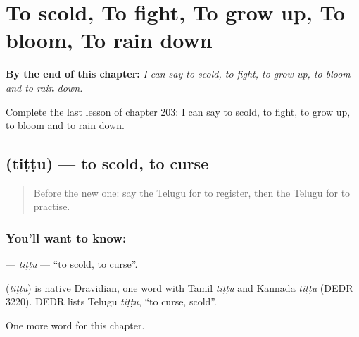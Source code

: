 
\chapter{To scold, To fight, To grow up, To bloom, To rain down}
\label{ch:te-to-scold-to-fight-to-grow-up-to-bloom-to-rain-down}

\begin{chapteropening}
\textbf{By the end of this chapter:} \emph{I can say to scold, to fight, to grow up, to bloom and to rain down.}

Complete the last lesson of chapter 203: I can say to scold, to fight, to grow up, to bloom and to rain down.
\end{chapteropening}

\section[\texorpdfstring{\te{తిట్టు} (tiṭṭu)}{తిట్టు (tiṭṭu)}]{ (tiṭṭu) — to scold, to curse}

\label{lesson:TE-C203-tittu}



\begin{quote}
Before the new one: say the Telugu for to register, then the Telugu for to practise.
\end{quote}

\subsection*{You'll want to know: }
\textbf{} — \emph{tiṭṭu} — \textquotedblleft{}to scold, to curse\textquotedblright{}.

\begin{cousinweb}
\textbf{} (\emph{tiṭṭu}) is native Dravidian, one word with Tamil \emph{tiṭṭu} and Kannada \emph{tiṭṭu} (DEDR 3220). DEDR lists Telugu \emph{tiṭṭu}, \textquotedblleft{}to curse, scold\textquotedblright{}.
\end{cousinweb}

\begin{grammarlens}[title={What you've built}]
One more word for this chapter.
\end{grammarlens}

